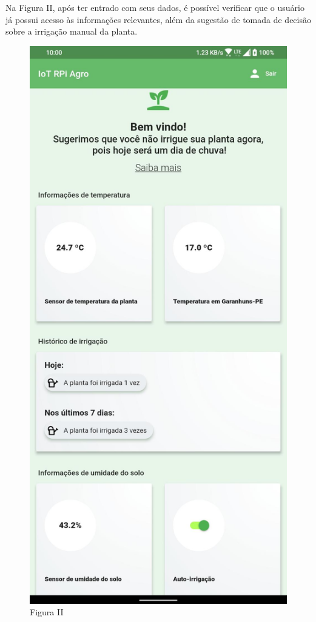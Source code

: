 \documentclass[eso]{bcc}
\begin{document}
Na Figura II, após ter entrado com seus dados, é possível verificar que o usuário já possui 
acesso às informações relevantes, além da sugestão de tomada de decisão sobre a irrigação manual da planta.


\begin{figure}[htbp]
\centerline{\includegraphics[scale=.25]{Figuras/figura-ii.jpg}}
\caption{Figura II}\label{fig-ii}
\end{figure}
\end{document}
